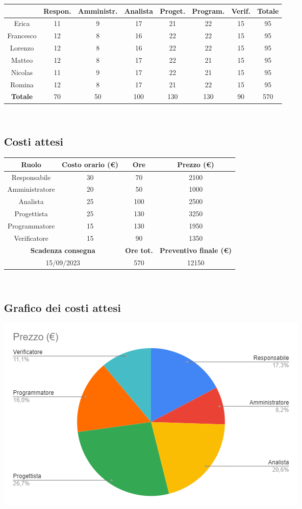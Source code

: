 \documentclass[a4paper, 12pt]{article}
\begin{document}
\begin{tabular}{|c|c|c|c|c|c|c|c|}
    \hline
    \textbf{} & \textbf{Respon.} & \textbf{Amministr.} & \textbf{Analista} & \textbf{Proget.} & \textbf{Program.} & \textbf{Verif.} & \textbf{Totale}\\
    \hline
    Erica & 11 & 9 & 17 & 21 & 22 & 15 & 95\\
    \hline
    Francesco & 12 & 8 & 16 & 22 & 22 & 15 & 95\\
    \hline
    Lorenzo & 12 & 8 & 16 & 22 & 22 & 15 & 95\\
    \hline
    Matteo & 12 & 8 & 17 & 22 & 21 & 15 & 95\\
    \hline
    Nicolas & 11 & 9 & 17 & 22 & 21 & 15 & 95\\
    \hline
    Romina & 12 & 8 & 17 & 21 & 22 & 15 & 95\\
    \hline
    \textbf{Totale} & 70 & 50 & 100 & 130 & 130 & 90 & 570\\
    \hline
\end{tabular}\\[8pt]

\subsection{Costi attesi}

\begin{tabular}{|c|c|c|c|}
    \hline
    \textbf{Ruolo} & \textbf{Costo orario (\euro)} & \textbf{Ore} & \textbf{Prezzo (\euro)}\\
    \hline
    Responsabile & 30 & 70 & 2100\\
    \hline
    Amministratore & 20 & 50 & 1000\\
    \hline
    Analista & 25 & 100 & 2500\\
    \hline
    Progettista & 25 & 130 & 3250\\
    \hline
    Programmatore & 15 & 130 & 1950\\
    \hline
    Verificatore & 15 & 90 & 1350\\
    \hline\hline
    \multicolumn{2}{|c|}{\textbf{Scadenza consegna}} & \textbf{Ore tot.} & \textbf{Preventivo finale (\euro)}\\
    \hline
    \multicolumn{2}{|c|}{15/09/2023} & 570 & 12150\\
    \hline
\end{tabular}\\[8pt]

\subsection{Grafico dei costi attesi}
\includegraphics{grafico_costi.png}
\end{document}
